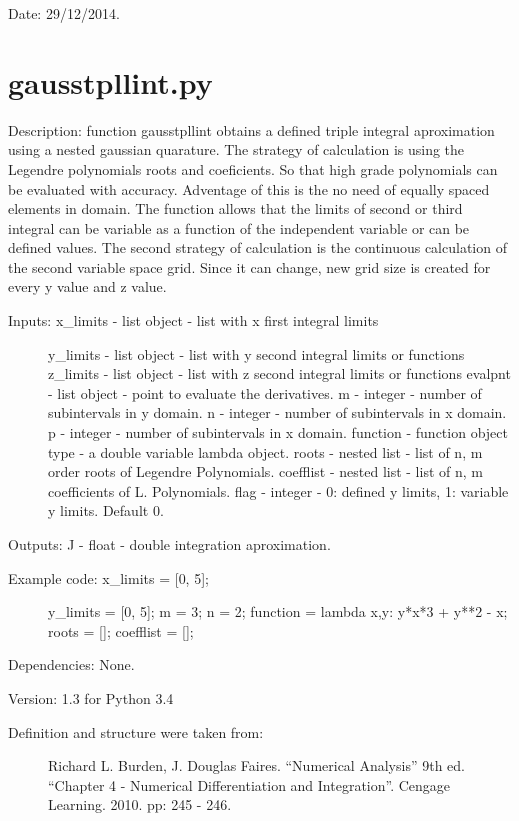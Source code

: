 \documentclass[letterpaper,10pt,oneside]{sphinxmanual}
\theoremstyle{plain}%
\theoremstyle{definition}%
\theoremstyle{remark}%
\begin{document}
Date: 29/12/2014.


\section{gausstpllint.py}
\label{code:module-gausstpllint}\label{code:gausstpllint-py}
Description: function gausstpllint obtains a defined triple integral 
aproximation using a nested gaussian quarature. The strategy of calculation
is using the Legendre polynomials roots and coeficients. So that high grade 
polynomials can be evaluated with accuracy. Adventage of this is the no need
of equally spaced elements in domain. The function allows that the limits of 
second or third integral can be variable as a function of the independent 
variable or can be defined values. The second strategy of calculation is 
the continuous calculation of the second variable space grid. Since it can 
change, new grid size is created for every y value and z value.
\begin{description}
\item[{Inputs: x\_limits - list object - list with x first integral limits}] \leavevmode
y\_limits - list object - list with y second integral limits or functions
z\_limits - list object - list with z second integral limits or functions
evalpnt - list object - point to evaluate the derivatives.
m - integer - number of subintervals in y domain.
n - integer - number of subintervals in x domain.
p - integer - number of subintervals in x domain.
function - function object type - a double variable lambda object.
roots - nested list - list of n, m order roots of Legendre Polynomials.
coefflist - nested list - list of n, m coefficients of L. Polynomials.
flag - integer - 0: defined y limits, 1: variable y limits. Default 0.

\end{description}

Outputs: J - float - double integration aproximation.
\begin{description}
\item[{Example code: x\_limits = {[}0, 5{]};}] \leavevmode
y\_limits = {[}0, 5{]};
m = 3;
n = 2;
function = lambda x,y: y*x*3 + y**2 - x;
roots = {[}{]};
coefflist = {[}{]};

\end{description}

Dependencies: None.

Version: 1.3 for Python 3.4
\begin{description}
\item[{Definition and structure were taken from:}] \leavevmode
Richard L. Burden, J. Douglas Faires. ``Numerical Analysis'' 9th ed.
``Chapter 4 - Numerical Differentiation and Integration''. 
Cengage Learning. 2010. pp: 245 - 246.

\end{description}
\end{document}

